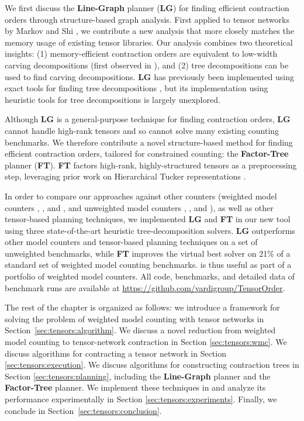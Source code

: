 We first discuss the \textbf{Line-Graph} planner (\textbf{LG}) for finding efficient contraction orders through structure-based graph analysis. First applied to tensor networks by Markov and Shi \cite{MS08}, we contribute a new analysis that more closely matches the memory usage of existing tensor libraries. Our analysis combines two theoretical insights: (1) memory-efficient contraction orders are equivalent to low-width carving decompositions (first observed in \cite{de15}), and (2) tree decompositions can be used to find carving decompositions. \textbf{LG} has previously been implemented using exact tools for finding tree decompositions \cite{DFGHSW18}, but its implementation using heuristic tools for tree decompositions is largely unexplored.

Although \textbf{LG} is a general-purpose technique for finding contraction orders, \textbf{LG} cannot handle high-rank tensors and so cannot solve many existing counting benchmarks. We therefore contribute a novel structure-based method for finding efficient contraction orders, tailored for constrained counting: the \textbf{Factor-Tree} planner (\textbf{FT}). \textbf{FT} factors high-rank, highly-structured tensors as a preprocessing step, leveraging prior work on Hierarchical Tucker representations \cite{Grasedyck10}.

In order to compare our approaches against other counters (weighted model counters  \cite{SBK05},  \cite{OD15}, and  \cite{LM17}, and unweighted model counters  \cite{CW16},  \cite{FHMW17}, and  \cite{Thurley2006}), as well as other tensor-based planning techniques, we implemented \textbf{LG} and \textbf{FT} in our new tool  using three state-of-the-art heuristic tree-decomposition solvers. \textbf{LG} outperforms other model counters and tensor-based planning techniques on a set of unweighted benchmarks, while \textbf{FT} improves the virtual best solver on 21\% of a standard set of weighted model counting benchmarks.  is thus useful as part of a portfolio of weighted model counters. All code, benchmarks, and detailed data of benchmark runs are available at \url{https://github.com/vardigroup/TensorOrder}.


The rest of the chapter is organized as follows: we introduce a framework for solving the problem of weighted model counting with tensor networks in Section~\ref{sec:tensors:algorithm}.
We discuss a novel reduction from weighted model counting to tensor-network contraction in Section \ref{sec:tensors:wmc}.
We discuss algorithms for contracting a tensor network in Section \ref{sec:tensors:execution}.
We discuss algorithms for constructing contraction trees in Section \ref{sec:tensors:planning}, including the \textbf{Line-Graph} planner and the \textbf{Factor-Tree} planner.
We implement these techniques in  and analyze its performance experimentally in Section \ref{sec:tensors:experiments}.
Finally, we conclude in Section~\ref{sec:tensors:conclusion}.
